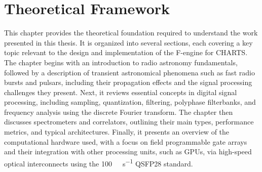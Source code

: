 
\chapter{Theoretical Framework}
This chapter provides the theoretical foundation required to understand the work presented in this thesis. It is organized into several sections, each covering a key topic relevant to the design and implementation of the F-engine for CHARTS. The chapter begins with an introduction to radio astronomy fundamentals, followed by a description of transient astronomical phenomena such as fast radio bursts and pulsars, including their propagation effects and the signal processing challenges they present. Next, it reviews essential concepts in digital signal processing, including sampling, quantization, filtering, polyphase filterbanks, and frequency analysis using the discrete Fourier transform. The chapter then discusses spectrometers and correlators, outlining their main types, performance metrics, and typical architectures. Finally, it presents an overview of the computational hardware used, with a focus on field programmable gate arrays and their integration with other processing units, such as GPUs, via high-speed optical interconnects using the \SI{100}{\giga \bit \per \second} QSFP28 standard.

